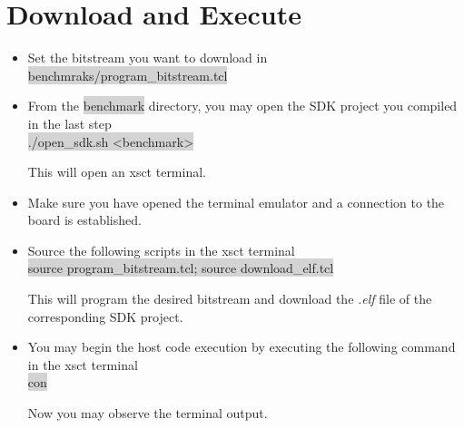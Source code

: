 \documentclass[11pt]{article}
\begin{document}
\section{Download and Execute}
\begin{itemize}
  \item Set the bitstream you want to download in \colorbox{lightGray}{benchmraks/program\_bitstream.tcl}
  \item From the \colorbox{lightGray}{benchmark} directory, you may open the SDK project you compiled in the last step \\
      \centering \colorbox{lightGray}{./open\_sdk.sh <benchmark>} \\
  \raggedright 
  This will open an xsct terminal.
  \item Make sure you have opened the terminal emulator and a connection to the board is established.
  \item Source the following scripts in the xsct terminal \\
      \centering \colorbox{lightGray}{source program\_bitstream.tcl; source download\_elf.tcl} \\
    \raggedright 
    This will program the desired bitstream and download the \emph{.elf} file of the corresponding SDK project.
  \item You may begin the host code execution by executing the following command in the xsct terminal\\
    \centering \colorbox{lightGray}{con} \\
    \raggedright 
      Now you may observe the terminal output.
\end{itemize}
\end{document}

